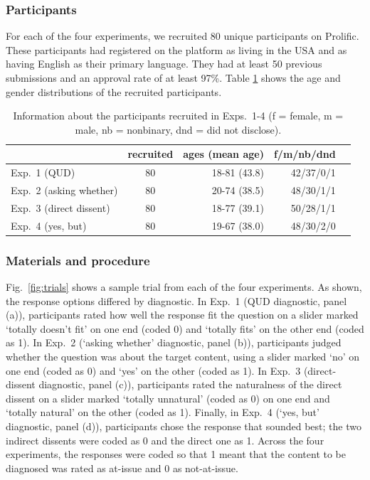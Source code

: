 \documentclass[times,linguex]{glossa}
\begin{document}
\subsubsection{Participants}
For each of the four experiments, we recruited 80 unique participants on Prolific. These participants had registered on the platform as living in the USA and as having English as their primary language. They had at least 50 previous submissions and an approval rate of at least 97\%. Table \ref{t:recruited} shows the age and gender distributions of the recruited participants.

\begin{table}[h!]
  \centering
  \begin{tabular}{l | c | r r r }
    & recruited & ages (mean age) & f/m/nb/dnd \\ \hline
    Exp.~1 (QUD) & 80 & 18-81 (43.8) & 42/37/0/1  \\
    Exp.~2 (asking whether) & 80 & 20-74 (38.5)  & 48/30/1/1  \\
    Exp.~3 (direct dissent) & 80 & 18-77 (39.1) & 50/28/1/1  \\
    Exp.~4 (yes, but) &80 & 19-67 (38.0)  & 48/30/2/0 &  \\
    \hline
  \end{tabular}
  
  \caption{Information about the participants recruited in Exps.~1-4 (f = female, m = male, nb = nonbinary, dnd = did not disclose).}\label{t:recruited}
\end{table}

\subsubsection{Materials and procedure}

Fig.~\ref{fig:trials} shows a sample trial from each of the four experiments. As shown, the response options differed by diagnostic. In Exp.~1 (QUD diagnostic, panel (a)), participants rated how well the response fit the question on a slider marked `totally doesn't fit' on one end (coded 0) and `totally fits' on the other end (coded as 1). In Exp.~2 (`asking whether' diagnostic, panel (b)), participants judged whether the question was about the target content, using a slider marked `no' on one end (coded as 0) and `yes' on the other (coded as 1). In Exp.~3 (direct-dissent diagnostic, panel (c)), participants rated the naturalness of the direct dissent on a slider marked `totally unnatural' (coded as 0) on one end and `totally natural' on the other (coded as 1). Finally, in Exp.~4 (`yes, but' diagnostic, panel (d)), participants chose the response that sounded best; the two indirect dissents were coded as 0 and the direct one as 1. Across the four experiments, the responses were coded so that 1 meant that the content to be diagnosed was rated as at-issue and 0 as not-at-issue.
\end{document}
